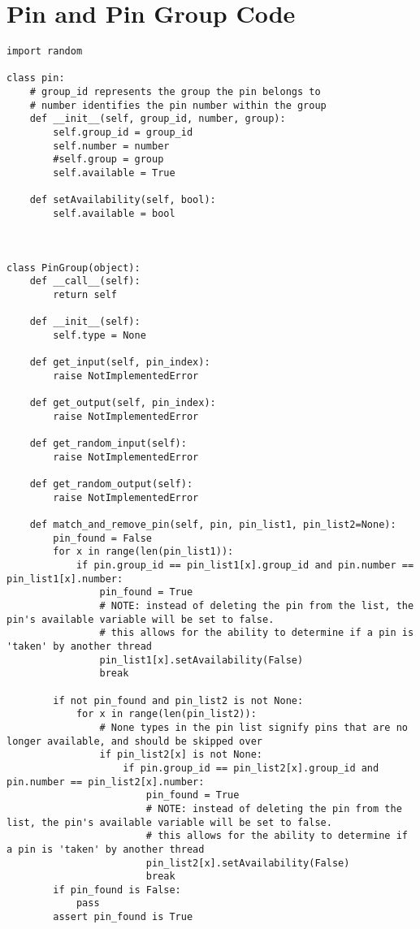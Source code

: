 \documentclass[a4paper]{article}
\begin{document}
\section{Pin and Pin Group Code}
\label{sec-4}
\begin{verbatim}
import random

class pin:
    # group_id represents the group the pin belongs to
    # number identifies the pin number within the group
    def __init__(self, group_id, number, group):
        self.group_id = group_id
        self.number = number
        #self.group = group
        self.available = True

    def setAvailability(self, bool):
        self.available = bool



class PinGroup(object):
    def __call__(self):
        return self

    def __init__(self):
        self.type = None

    def get_input(self, pin_index):
        raise NotImplementedError

    def get_output(self, pin_index):
        raise NotImplementedError

    def get_random_input(self):
        raise NotImplementedError

    def get_random_output(self):
        raise NotImplementedError

    def match_and_remove_pin(self, pin, pin_list1, pin_list2=None):
        pin_found = False
        for x in range(len(pin_list1)):
            if pin.group_id == pin_list1[x].group_id and pin.number == pin_list1[x].number:
                pin_found = True
                # NOTE: instead of deleting the pin from the list, the pin's available variable will be set to false.
                # this allows for the ability to determine if a pin is 'taken' by another thread
                pin_list1[x].setAvailability(False)
                break

        if not pin_found and pin_list2 is not None:
            for x in range(len(pin_list2)):
                # None types in the pin list signify pins that are no longer available, and should be skipped over
                if pin_list2[x] is not None:
                    if pin.group_id == pin_list2[x].group_id and pin.number == pin_list2[x].number:
                        pin_found = True
                        # NOTE: instead of deleting the pin from the list, the pin's available variable will be set to false.
                        # this allows for the ability to determine if a pin is 'taken' by another thread
                        pin_list2[x].setAvailability(False)
                        break
        if pin_found is False:
            pass
        assert pin_found is True



\end{verbatim}
\end{document}
